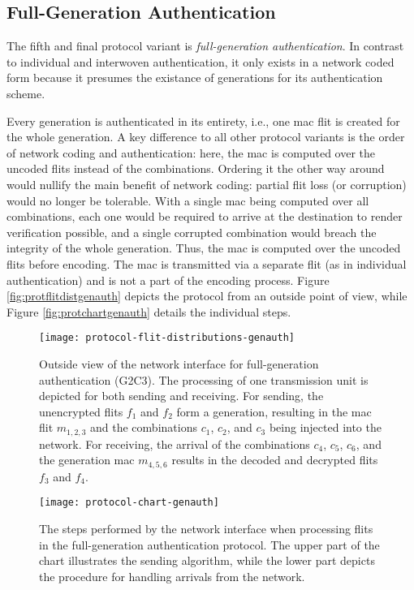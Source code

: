 \subsection{Full-Generation Authentication}\label{subsec:genauth}
The fifth and final protocol variant is \textit{full-generation authentication}. In contrast to individual and interwoven authentication, it only
exists in a network coded form because it presumes the existance of generations for its authentication scheme.

Every generation is authenticated in its entirety, i.e., one \gls{mac} flit is created for the whole generation. A key difference to all other
protocol variants is the order of network coding and authentication: here, the \gls{mac} is computed over the uncoded flits instead of the
combinations. Ordering it the other way around would nullify the main benefit of network coding: partial flit loss (or corruption) would no longer be
tolerable. With a single \gls{mac} being computed over all combinations, each one would be required to arrive at the destination to render verification
possible, and a single corrupted combination would breach the integrity of the whole generation. Thus, the \gls{mac} is computed over the uncoded
flits before encoding. The \gls{mac} is transmitted via a separate flit (as in individual authentication) and is not a part of the encoding process.
Figure \vref{fig:protflitdistgenauth} depicts the protocol from an outside point of view, while Figure \vref{fig:protchartgenauth} details the
individual steps.

\begin{figure}
    \centering
    \texttt{[image: protocol-flit-distributions-genauth]}
    \caption[Full-gen. auth., outside view]{Outside view of the network interface for full-generation authentication (G2C3). The processing of one
    transmission unit is depicted for both sending and receiving. For sending, the unencrypted flits $f_1$ and $f_2$ form a generation, resulting in
    the \gls{mac} flit $m_{1,2,3}$ and the combinations $c_1$, $c_2$, and $c_3$ being injected into the network. For receiving, the arrival of the
    combinations $c_4$, $c_5$, $c_6$, and the generation \gls{mac} $m_{4,5,6}$ results in the decoded and decrypted flits $f_3$ and $f_4$.}
    \label{fig:protflitdistgenauth}
\end{figure}

\begin{figure}
    \centering
    \texttt{[image: protocol-chart-genauth]}
    \caption[Full-gen. auth., detailed procedure]{The steps performed by the network interface when processing flits in the full-generation
    authentication protocol. The upper part of the chart illustrates the sending algorithm, while the lower part depicts the procedure for handling
    arrivals from the network.}
    \label{fig:protchartgenauth}
\end{figure}

